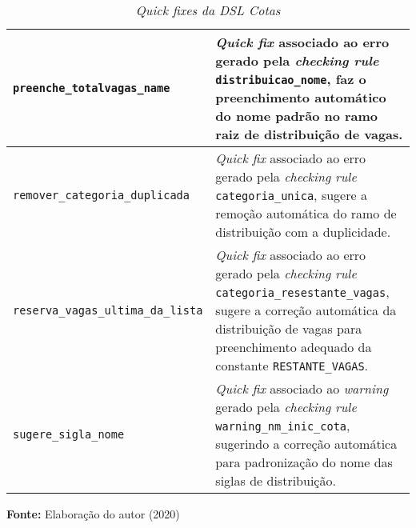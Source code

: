 \begin{table}[ht]
\caption{\textit{Quick fixes da DSL Cotas}}
\label{tblquickfixes}
\centering

\begin{tabular}{|p{6cm}|p{9cm}|}
\hline
\texttt{preenche\_totalvagas\_name} & \textit{Quick fix} associado ao erro gerado pela \textit{checking rule} \texttt{distribuicao\_nome}, faz o preenchimento automático do nome padrão no ramo raiz de distribuição de vagas.                                                                                      \\ \hline
\texttt{remover\_categoria\_duplicada} & \textit{Quick fix} associado ao erro gerado pela \textit{checking rule} \texttt{categoria\_unica}, sugere a remoção automática do ramo de distribuição com a duplicidade.

\\ \hline
\texttt{reserva\_vagas\_ultima\_da\_lista} & \textit{Quick fix} associado ao erro gerado pela \textit{checking rule} \texttt{categoria\_resestante\_vagas}, sugere a correção automática da distribuição de vagas para preenchimento adequado da constante \texttt{RESTANTE\_VAGAS}.

\\ \hline
\texttt{sugere\_sigla\_nome} & \textit{Quick fix} associado ao \textit{warning} gerado pela \textit{checking rule} \texttt{warning\_nm\_inic\_cota}, sugerindo a correção automática para padronização do nome das siglas de distribuição.
                  \\ \hline      

\end{tabular}

  \par\medskip\textbf{Fonte:} Elaboração do autor (2020) \par\medskip
\end{table}

